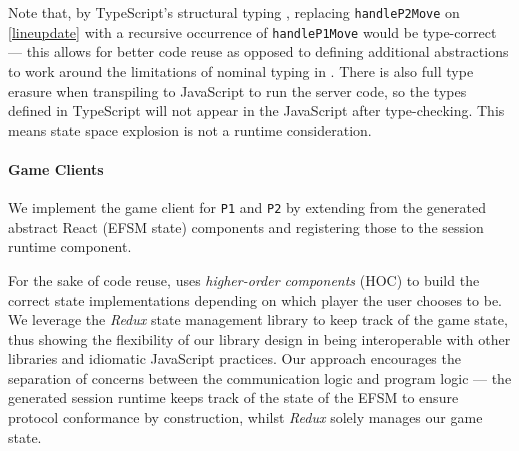 Note that, by TypeScript's structural typing
\cite{TypeScriptSpec}, replacing
\texttt{handleP2Move} on \cref{lineupdate} with a recursive
occurrence of \texttt{handleP1Move} would be
type-correct --- this allows for better code reuse as opposed to
defining
additional abstractions to work around the limitations of nominal
typing in
\cite{Hybrid2016}.
There is also full type erasure when transpiling to JavaScript to
run the
server code, so the types defined in TypeScript will not appear in the
JavaScript after type-checking.
This means state space explosion is not a runtime consideration.

\paragraph{Game Clients}
We implement the game client for \texttt{P1} and
\texttt{P2} by extending from the generated abstract React (EFSM state)
components and registering those to the session runtime component.

For the sake of code reuse, \cite{NoughtsAndCrosses}
uses \textit{higher-order components} (HOC) to build the correct state
implementations depending on which player the user chooses to be.
We leverage the \textit{Redux} \cite{Redux} state management library to keep
track of the game state, thus showing the flexibility of our library design in
being interoperable with other libraries and idiomatic JavaScript practices.
Our approach encourages the separation of concerns between the
communication logic and program logic --- the generated session runtime
keeps track of the state of the EFSM to ensure protocol conformance by
construction, whilst \textit{Redux} solely manages our game state.
